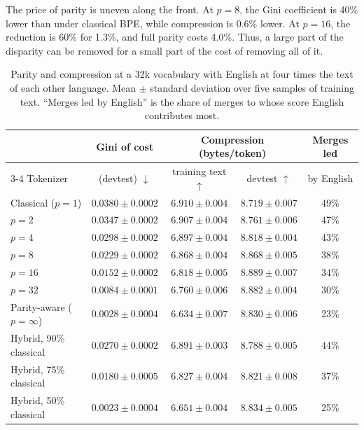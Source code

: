 The price of parity is uneven along the front. At $p=8$, the Gini coefficient is 40\% lower
than under classical BPE, while compression is 0.6\% lower. At $p=16$, the reduction is 60\%
for 1.3\%, and full parity costs 4.0\%. Thus, a large part of the disparity can be removed
for a small part of the cost of removing all of it.

\begin{table}[t]
\centering
\small
\begin{tabular}{lcccc}
\toprule
 & Gini of cost & \multicolumn{2}{c}{Compression (bytes/token)} & Merges led\\
\cmidrule(lr){3-4}
Tokenizer & (devtest) $\downarrow$ & training text $\uparrow$ & devtest $\uparrow$ & by English\\
\midrule
Classical ($p=1$) & $0.0380\pm0.0002$ & $6.910\pm0.004$ & $8.719\pm0.007$ & 49\%\\
$p=2$  & $0.0347\pm0.0002$ & $6.907\pm0.004$ & $8.761\pm0.006$ & 47\%\\
$p=4$  & $0.0298\pm0.0002$ & $6.897\pm0.004$ & $8.818\pm0.004$ & 43\%\\
$p=8$  & $0.0229\pm0.0002$ & $6.868\pm0.004$ & $8.868\pm0.005$ & 38\%\\
$p=16$ & $0.0152\pm0.0002$ & $6.818\pm0.005$ & $8.889\pm0.007$ & 34\%\\
$p=32$ & $0.0084\pm0.0001$ & $6.760\pm0.006$ & $8.882\pm0.004$ & 30\%\\
Parity-aware ($p=\infty$) & $0.0028\pm0.0004$ & $6.634\pm0.007$ & $8.830\pm0.006$ & 23\%\\
\midrule
Hybrid, 90\% classical & $0.0270\pm0.0002$ & $6.891\pm0.003$ & $8.788\pm0.005$ & 44\%\\
Hybrid, 75\% classical & $0.0180\pm0.0005$ & $6.827\pm0.004$ & $8.821\pm0.008$ & 37\%\\
Hybrid, 50\% classical & $0.0023\pm0.0004$ & $6.651\pm0.004$ & $8.834\pm0.005$ & 25\%\\
\bottomrule
\end{tabular}
\caption{Parity and compression at a 32k vocabulary with English at four times the text of
each other language. Mean $\pm$ standard deviation over five samples of training text.
``Merges led by English'' is the share of merges to whose score English contributes most.}
\label{tab:front}
\end{table}

